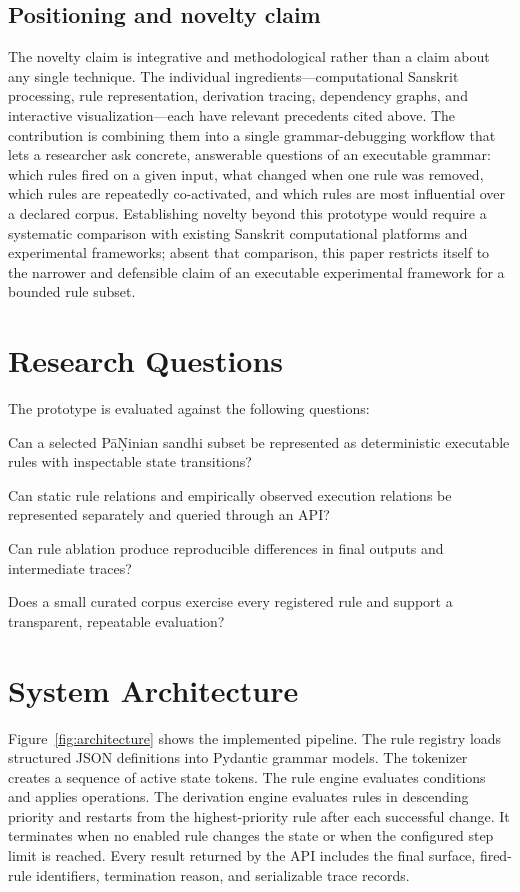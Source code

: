 \documentclass[conference]{IEEEtran}
\begin{document}
\subsection{Positioning and novelty claim}
The novelty claim is integrative and methodological rather than a claim about any single technique. The individual ingredients---computational Sanskrit processing, rule representation, derivation tracing, dependency graphs, and interactive visualization---each have relevant precedents cited above. The contribution is combining them into a single grammar-debugging workflow that lets a researcher ask concrete, answerable questions of an executable grammar: which rules fired on a given input, what changed when one rule was removed, which rules are repeatedly co-activated, and which rules are most influential over a declared corpus. Establishing novelty beyond this prototype would require a systematic comparison with existing Sanskrit computational platforms and experimental frameworks; absent that comparison, this paper restricts itself to the narrower and defensible claim of an executable experimental framework for a bounded rule subset.

\section{Research Questions}
The prototype is evaluated against the following questions:
\begin{description}[leftmargin=2.4em,labelindent=0pt,style=nextline]
  \item[RQ1] Can a selected P\={a}\d{N}inian sandhi subset be represented as deterministic executable rules with inspectable state transitions?
  \item[RQ2] Can static rule relations and empirically observed execution relations be represented separately and queried through an API?
  \item[RQ3] Can rule ablation produce reproducible differences in final outputs and intermediate traces?
  \item[RQ4] Does a small curated corpus exercise every registered rule and support a transparent, repeatable evaluation?
\end{description}

\section{System Architecture}
Figure~\ref{fig:architecture} shows the implemented pipeline. The rule registry loads structured JSON definitions into Pydantic grammar models. The tokenizer creates a sequence of active state tokens. The rule engine evaluates conditions and applies operations. The derivation engine evaluates rules in descending priority and restarts from the highest-priority rule after each successful change. It terminates when no enabled rule changes the state or when the configured step limit is reached. Every result returned by the API includes the final surface, fired-rule identifiers, termination reason, and serializable trace records.
\end{document}
